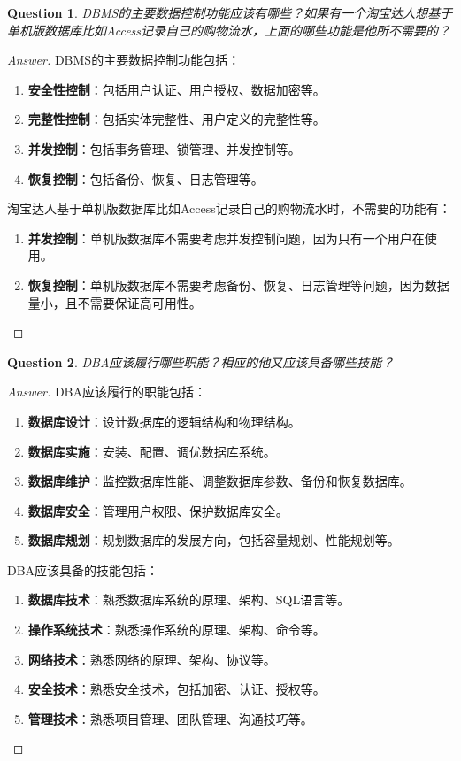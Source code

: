 \documentclass[UTF8,a4paper,10pt]{article}
\newtheorem{question}{Question}
\newenvironment{solution}
  {\begin{proof}[Answer]}
  {\end{proof}}
\begin{document}
	\begin{question}
	DBMS的主要数据控制功能应该有哪些？如果有一个淘宝达人想基于单机版数据库比如Access记录自己的购物流水，上面的哪些功能是他所不需要的？
	\end{question}

	\begin{solution}
	DBMS的主要数据控制功能包括：
	\begin{enumerate}
		\item \textbf{安全性控制}：包括用户认证、用户授权、数据加密等。
		\item \textbf{完整性控制}：包括实体完整性、用户定义的完整性等。
		\item \textbf{并发控制}：包括事务管理、锁管理、并发控制等。
		\item \textbf{恢复控制}：包括备份、恢复、日志管理等。
	\end{enumerate}

	淘宝达人基于单机版数据库比如Access记录自己的购物流水时，不需要的功能有：
	\begin{enumerate}
		\item \textbf{并发控制}：单机版数据库不需要考虑并发控制问题，因为只有一个用户在使用。
		\item \textbf{恢复控制}：单机版数据库不需要考虑备份、恢复、日志管理等问题，因为数据量小，且不需要保证高可用性。
	\end{enumerate}

	\end{solution}

	\begin{question}
	DBA应该履行哪些职能？相应的他又应该具备哪些技能？
	\end{question}

	\begin{solution}

	DBA应该履行的职能包括：
	\begin{enumerate}
		\item \textbf{数据库设计}：设计数据库的逻辑结构和物理结构。
		\item \textbf{数据库实施}：安装、配置、调优数据库系统。
		\item \textbf{数据库维护}：监控数据库性能、调整数据库参数、备份和恢复数据库。
		\item \textbf{数据库安全}：管理用户权限、保护数据库安全。
		\item \textbf{数据库规划}：规划数据库的发展方向，包括容量规划、性能规划等。
	\end{enumerate}

	DBA应该具备的技能包括：
	\begin{enumerate}
		\item \textbf{数据库技术}：熟悉数据库系统的原理、架构、SQL语言等。
		\item \textbf{操作系统技术}：熟悉操作系统的原理、架构、命令等。
		\item \textbf{网络技术}：熟悉网络的原理、架构、协议等。
		\item \textbf{安全技术}：熟悉安全技术，包括加密、认证、授权等。
		\item \textbf{管理技术}：熟悉项目管理、团队管理、沟通技巧等。
	\end{enumerate}

	\end{solution}
\end{document}
